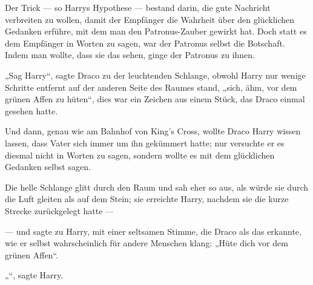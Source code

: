 Der Trick — so Harrys Hypothese — bestand darin, die gute Nachricht verbreiten zu wollen, damit der Empfänger die Wahrheit über den glücklichen Gedanken erführe, mit dem man den Patronus-Zauber gewirkt hat. Doch statt es dem Empfänger in Worten zu sagen, war der Patronus selbst die Botschaft. Indem man wollte, dass sie das sehen, ginge der Patronus zu ihnen.

„Sag Harry“, sagte Draco zu der leuchtenden Schlange, obwohl Harry nur wenige Schritte entfernt auf der anderen Seite des Raumes stand, „sich, ähm, vor dem grünen Affen zu hüten“, dies war ein Zeichen aus einem Stück, das Draco einmal gesehen hatte.

Und dann, genau wie am Bahnhof von King’s Cross, wollte Draco Harry wissen lassen, dass Vater sich immer um ihn gekümmert hatte; nur versuchte er es diesmal nicht in Worten zu sagen, sondern wollte es mit dem glücklichen Gedanken selbst sagen.

Die helle Schlange glitt durch den Raum und sah eher so aus, als würde sie durch die Luft gleiten als auf dem Stein; sie erreichte Harry, nachdem sie die kurze Strecke zurückgelegt hatte —

— und sagte zu Harry, mit einer seltsamen Stimme, die Draco als das erkannte, wie er selbst wahrscheinlich für andere Menschen klang:
„Hüte dich vor dem grünen Affen“.

„“, sagte Harry.

